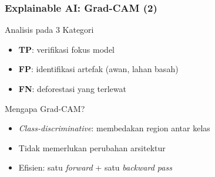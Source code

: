 \documentclass{beamer}
\begin{document}
	\begin{frame}
		\frametitle{Explainable AI: Grad-CAM (2)}
		\begin{alertblock}{Analisis pada 3 Kategori}
			\scriptsize
			\begin{itemize}
				\item \textbf{TP}: verifikasi fokus model
				\item \textbf{FP}: identifikasi artefak
				(awan, lahan basah)
				\item \textbf{FN}: deforestasi yang terlewat
			\end{itemize}
		\end{alertblock}
		
		\begin{block}{Mengapa Grad-CAM?}
			\small
			\begin{itemize}
				\item \textit{Class-discriminative}: membedakan
				region antar kelas 
				\item Tidak memerlukan perubahan arsitektur
				\item Efisien: satu \textit{forward} + satu
				\textit{backward pass}
			\end{itemize}
		\end{block}
	\end{frame}
	
\end{document}
